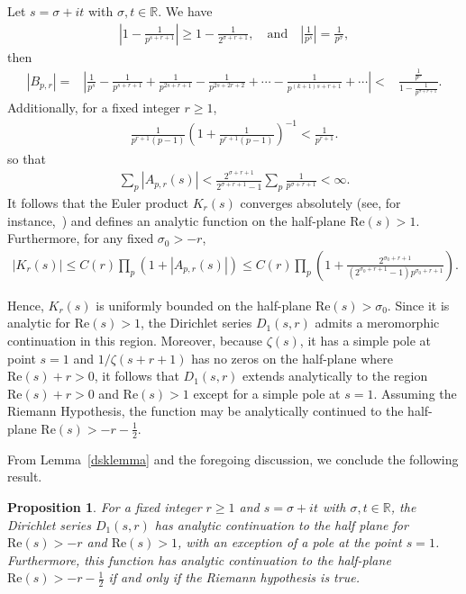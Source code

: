 \documentclass[12pt, oneside,reqno]{amsart}
\numberwithin{equation}{section}
\newtheorem{proposition}[theorem]{Proposition}
\begin{document}
Let $s=\sigma+it$ with $\sigma, t\in\mathbb{R}$. We have
\begin{align*}
\left|1-\frac{1}{p^{s+r+1}}\right|  
\geq 1-\frac{1}{2^{\sigma+r+1}},\quad\mathrm{and}\quad
\left|\frac{1}{p^s}\right|
= \frac{1}{p^{\sigma}},
\end{align*}
then
\begin{align*}
|B_{p,r}|
=&\left|\frac{1}{p^s}-\frac{1}{p^{s+r+1}}+\frac{1}{p^{2s+r+1}}-\frac{1}{p^{2s+2r+2}}+\cdots-\frac{1}{p^{(k+1)s+r+1}}+\cdots\right|
<&\frac{\frac{1}{p^{\sigma}}}{1-\frac{1}{p^{\sigma+r+1}}}.
\end{align*}
\noindent
Additionally, for a fixed integer $r\geq 1$,
\begin{align*}
{\frac{1}{p^{r+1}(p-1)}}\left({1+\frac{1}{p^{r+1}(p-1)}}\right)^{-1}<\frac{1}{p^{r+1}}.    
\end{align*}
\noindent
so that
\begin{align*}
\sum_{p}|A_{p,r}(s)|
<\frac{2^{\sigma+r+1}}{2^{\sigma+r+1}-1}\sum_{p}\frac{1}{p^{\sigma+r+1}}
<\infty.
\end{align*}
\noindent
It follows that the Euler product $K_r(s)$ converges absolutely (see, for instance,~\cite[\S1.42]{titchmarsh}) and defines an analytic function on the half-plane $\mathrm{Re}(s)>1$. Furthermore, for any fixed $\sigma_0>-r$,
\begin{align*}
|K_r(s)|
\leq C(r)\prod_{p}\left(1+|A_{p,r}(s)|\right)
\leq C(r)\prod_{p}\left(1+\frac{2^{\sigma_0+r+1}}{(2^{\sigma_0+r+1}-1)p^{\sigma_0+r+1}}\right).
\end{align*}

\noindent
Hence, $K_r(s)$ is uniformly bounded on the half-plane $\mathrm{Re}(s)>\sigma_0$. Since it is analytic for $\mathrm{Re}(s)>1$, the Dirichlet series $D_1(s,r)$ admits a meromorphic continuation in this region. Moreover, because $\zeta(s)$, it has a simple pole at point $s=1$ and $1/\zeta(s+r+1)$ has no zeros on the half-plane where $\mathrm{Re}(s)+r>0$, it follows that $D_1(s,r)$ extends analytically to the region $\mathrm{Re}(s)+r>0$ and $\mathrm{Re}(s)>1$ except for a simple pole at $s=1$. Assuming the Riemann Hypothesis, the function may be analytically continued to the half-plane $\mathrm{Re}(s)>-r-\frac{1}{2}$.

\medskip

From Lemma~\ref{dsklemma} and the foregoing discussion, we conclude the following result.

\begin{proposition}\label{arsconvergence}
For a fixed integer $r\geq 1$ and $s=\sigma+it$ with $\sigma,t\in\mathbb{R}$, the Dirichlet series $D_1(s,r)$ has analytic continuation to the half plane for $\mathrm{Re}(s)>-r$ and $\mathrm{Re}(s)>1$, with an exception of a pole at the point $s=1$. Furthermore, this function has analytic continuation to the half-plane $\mathrm{Re}(s)>-r-\frac{1}{2}$ if and only if the Riemann hypothesis is true.    
\end{proposition}
\end{document}
